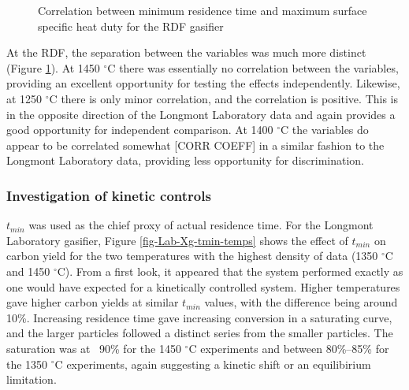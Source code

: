 \documentclass[11pt,twocolumn]{article}
\begin{document}
\begin{figure}[hp]

\caption{Correlation between minimum residence time and maximum surface specific heat duty for the RDF gasifier}
\label{fig-RDF-dH_max-tmin}
\end{figure}



At the RDF, the separation between the variables was much more distinct (Figure \ref{fig-RDF-dH_max-tmin}).  At 1450 $^{\circ}$C there was essentially no correlation between the variables, providing an excellent opportunity for testing the effects independently.  Likewise, at 1250 $^{\circ}$C there is only minor correlation, and the correlation is positive.  This is in the opposite direction of the Longmont Laboratory data and again provides a good opportunity for independent comparison.  At 1400 $^{\circ}$C the variables do appear to be correlated somewhat [CORR COEFF] in a similar fashion to the Longmont Laboratory data, providing less opportunity for discrimination.

\subsubsection*{Investigation of kinetic controls}

$t_{min}$ was used as the chief proxy of actual residence time.  For the Longmont Laboratory gasifier, Figure \ref{fig-Lab-Xg-tmin-temps} shows the effect of $t_{min}$ on carbon yield for the two temperatures with the highest density of data (1350 $^{\circ}$C and 1450 $^{\circ}$C).  From a first look, it appeared that the system performed exactly as one would have expected for a kinetically controlled system.  Higher temperatures gave higher carbon yields at similar $t_{min}$ values, with the difference being around 10\%.  Increasing residence time gave increasing conversion in a saturating curve, and the larger particles followed a distinct series from the smaller particles.  The saturation was at ~90\% for the 1450 $^{\circ}$C experiments and between 80\%--85\% for the 1350 $^{\circ}$C experiments, again suggesting a kinetic shift or an equilibirium limitation.
\end{document}
